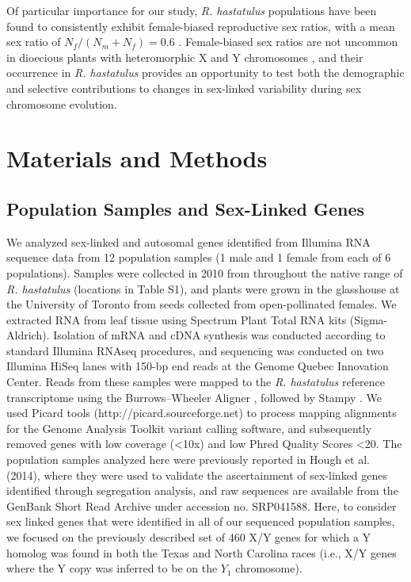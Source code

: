 \documentclass[9pt,twocolumn,twoside]{gsajnl}
\begin{document}
Of particular importance for our study, \textit{R. hastatulus} populations have been found to consistently exhibit female-biased reproductive sex ratios, with a mean sex ratio of $N_{f}/(N_{m}+N_{f})=0.6$ \citep{pickup2013influence}. Female-biased sex ratios are not uncommon in dioecious plants with heteromorphic X and Y chromosomes \citep{field2013comparative,hough2013evolutionarily}, and their occurrence in \textit{R. hastatulus} provides an opportunity to test both the demographic and selective contributions to changes in sex-linked variability during sex chromosome evolution.

\section*{Materials and Methods}
\subsection*{Population Samples and Sex-Linked Genes}
We analyzed sex-linked and autosomal genes identified from Illumina RNA sequence data from 12 population samples (1 male and 1 female from each of 6 populations). Samples were collected in 2010 from throughout the native range of \textit{R. hastatulus} (locations in Table S1), and plants were grown in the glasshouse at the University of Toronto from seeds collected from open-pollinated females. We extracted RNA from leaf tissue using Spectrum Plant Total RNA kits (Sigma-Aldrich). Isolation of mRNA and cDNA synthesis was conducted according to standard Illumina RNAseq procedures, and sequencing was conducted on two Illumina HiSeq lanes with 150-bp end reads at the Genome Quebec Innovation Center. Reads from these samples were mapped to the \textit{R. hastatulus} reference transcriptome \citep{hough2014} using the Burrows–Wheeler Aligner \citep{li2010fast}, followed by Stampy \citep{lunter2011stampy}. We used Picard tools (http://picard.sourceforge.net) to process mapping alignments for the Genome Analysis Toolkit \citep{mckenna2010genome} variant calling software, and subsequently removed genes with low coverage (<10x) and low Phred Quality Scores <20. The population samples analyzed here were previously reported in Hough et al. (2014), where they were used to validate the ascertainment of sex-linked genes identified through segregation analysis, and raw sequences are available from the GenBank Short Read Archive under accession no. SRP041588. Here, to consider sex linked genes that were identified in all of our sequenced population samples, we focused on the previously described set of 460 X/Y genes for which a Y homolog was found in both the Texas and North Carolina races (i.e., X/Y genes where the Y copy was inferred to be on the $Y_{1}$ chromosome).
\end{document}
